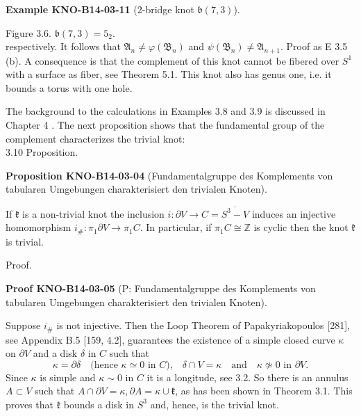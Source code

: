 \documentclass[10pt, letterpaper]{article}
\newcommand{\CustomHeading}[3]{%
  \par\medskip\noindent%
  \textbf{#1 #2} \textnormal{(#3)}.\enskip%
}
\newenvironment{PROP}[2]{\begin{unitbox}\CustomHeading{Proposition}{#1}{#2}}{\end{unitbox}}
\newenvironment{EXA}[2]{\begin{unitbox}\CustomHeading{Example}{#1}{#2}}{\end{unitbox}}
\newenvironment{PROOF}[2]{\begin{unitbox}\CustomHeading{Proof}{#1}{#2}}{\end{unitbox}}
\begin{document}
\begin{EXA}{KNO-B14-03-11}{2-bridge knot $\mathfrak{b}(7,3)$}
Figure 3.6. $\mathfrak{b}(7,3)=5_{2}$.\\
respectively. It follows that $\mathfrak{A}_{n} \neq \varphi\left(\mathfrak{B}_{n}\right)$ and $\psi\left(\mathfrak{B}_{n}\right) \neq \mathfrak{A}_{n+1}$. Proof as E 3.5 (b). A consequence is that the complement of this knot cannot be fibered over $S^{1}$ with a surface as fiber, see Theorem 5.1. This knot also has genus one, i.e. it bounds a torus with one hole.
\end{EXA}




The background to the calculations in Examples 3.8 and 3.9 is discussed in Chapter 4 . The next proposition shows that the fundamental group of the complement characterizes the trivial knot:\\




3.10 Proposition. 


\begin{PROP}{KNO-B14-03-04}{Fundamentalgruppe des Komplements von tabularen Umgebungen charakterisiert den trivialen Knoten}
If $\mathfrak{k}$ is a non-trivial knot the inclusion $i: \partial V \rightarrow C=\overline{S^{3}-V}$ induces an injective homomorphism $i_{\#}: \pi_{1} \partial V \rightarrow \pi_{1} C$. In particular, if $\pi_{1} C \cong \mathbb{Z}$ is cyclic then the knot $\mathfrak{k}$ is trivial.
\end{PROP}

Proof. 

\begin{PROOF}{KNO-B14-03-05}{P: Fundamentalgruppe des Komplements von tabularen Umgebungen charakterisiert den trivialen Knoten}
Suppose $i_{\#}$ is not injective. Then the Loop Theorem of Papakyriakopoulos [281], see Appendix B.5 [159, 4.2], guarantees the existence of a simple closed curve $\kappa$ on $\partial V$ and a disk $\delta$ in $C$ such that
$$
\kappa = \partial \delta 
\quad \text{(hence } \kappa \simeq 0 \text{ in } C\text{),} \quad 
\delta \cap V = \kappa \quad \text{and} \quad 
\kappa \not\simeq 0 \text{ in } \partial V\text{.}
$$
Since $\kappa$ is simple and $\kappa \sim 0$ in $C$ it is a longitude, see 3.2. So there is an annulus $A \subset V$ such that $A \cap \partial V=\kappa, \partial A=\kappa \cup \mathfrak{k}$, as has been shown in Theorem 3.1. This proves that $\mathfrak{k}$ bounds a disk in $S^{3}$ and, hence, is the trivial knot.
\end{PROOF}



\pagebreak
\end{document}
